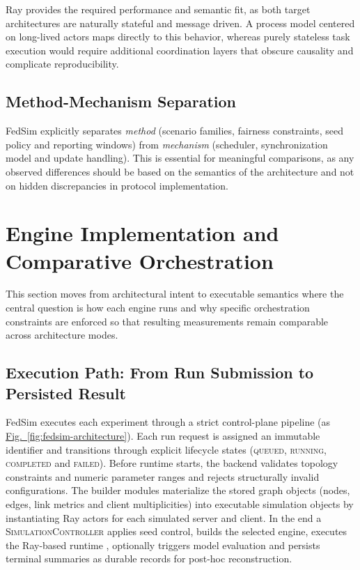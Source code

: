 \documentclass[conference]{IEEEtran}
\newcommand{\figref}[1]{\hyperref[#1]{Fig.~\ref*{#1}}}
\begin{document}
Ray provides the required performance and semantic fit, as both target architectures are naturally stateful and message driven. A process model centered on long-lived actors maps directly to this behavior, whereas purely stateless task execution would require additional coordination layers that obscure causality and complicate reproducibility.

\subsection{Method-Mechanism Separation}
FedSim explicitly separates \textit{method} (scenario families, fairness constraints, seed policy and reporting windows) from \textit{mechanism} (scheduler, synchronization model and update handling). This is essential for meaningful comparisons, as any observed differences should be based on the semantics of the architecture and not on hidden discrepancies in protocol implementation.

\section{Engine Implementation and Comparative Orchestration}
\label{sec:engines}
This section moves from architectural intent to executable semantics where the central question is how each engine runs and why specific orchestration constraints are enforced so that resulting measurements remain comparable across architecture modes.

\subsection{Execution Path: From Run Submission to Persisted Result}
FedSim executes each experiment through a strict control-plane pipeline (as \figref{fig:fedsim-architecture}). Each run request is assigned an immutable identifier and transitions through explicit lifecycle states (\textsc{queued}, \textsc{running}, \textsc{completed} and \textsc{failed}). Before runtime starts, the backend validates topology constraints and numeric parameter ranges and rejects structurally invalid configurations. The builder modules materialize the stored graph objects (nodes, edges, link metrics and client multiplicities) into executable simulation objects by instantiating Ray actors for each simulated server and client. In the end a \textsc{SimulationController} applies seed control, builds the selected engine, executes the Ray-based runtime \cite{moritz2018ray}, optionally triggers model evaluation and persists terminal summaries as durable records for post-hoc reconstruction.
\end{document}
